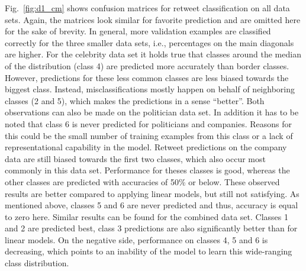 Fig.~\ref{fig:d1_cm} shows confusion matrices for retweet classification on all
data sets.
Again, the matrices look similar for favorite prediction and are omitted
here for the sake of brevity.
In general, more validation examples are classified correctly for the three
smaller data sets, i.e., percentages on the main diagonals are higher.
For the celebrity data set it holds true that classes around the median of the
distribution (class 4) are predicted more accurately than border classes.
However, predictions for these less common classes are less biased towards
the biggest class.
Instead, misclassifications mostly happen on behalf of neighboring classes (2 and 5),
which makes the predictions in a sense ``better''.
Both observations can also be made on the politician data set.
In addition it has to be noted that class 6 is never predicted for politicians
and companies.
Reasons for this could be the small number of training examples from this class
or a lack of representational capability in the model.
Retweet predictions on the company data are still biased towards the first
two classes, which also occur most commonly in this data set.
Performance for theses classes is good, whereas the other classes are predicted
with accuracies of 50\% or below.
These observed results are better compared to applying linear models, but still
not satisfying.
As mentioned above, classes 5 and 6 are never predicted and thus, accuracy is
equal to zero here.
Similar results can be found for the combined data set.
Classes 1 and 2 are predicted best, class 3 predictions are also significantly
better than for linear models.
On the negative side, performance on classes 4, 5 and 6 is decreasing, which
points to an inability of the model to learn this wide-ranging class
distribution.

